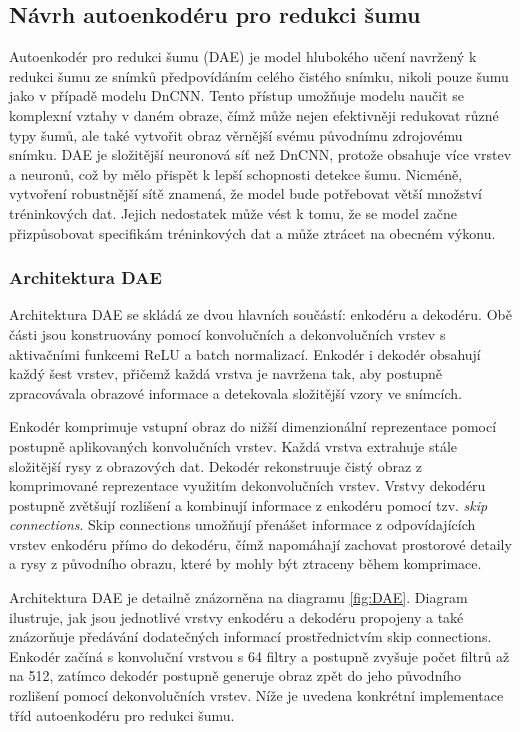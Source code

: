 \documentclass[male,czech,api_ing]{thesis}
\begin{document}
\subsection{Návrh autoenkodéru pro redukci šumu}
Autoenkodér pro redukci šumu (DAE) je model hlubokého učení navržený k redukci šumu ze snímků předpovídáním celého čistého snímku, nikoli pouze šumu jako v případě modelu DnCNN. Tento přístup umožňuje modelu naučit se komplexní vztahy v daném obraze, čímž může nejen efektivněji redukovat různé typy šumů, ale také vytvořit obraz věrnější svému původnímu zdrojovému snímku. DAE je složitější neuronová síť než DnCNN, protože obsahuje více vrstev a neuronů, což by mělo přispět k lepší schopnosti detekce šumu. Nicméně, vytvoření robustnější sítě znamená, že model bude potřebovat větší množství tréninkových dat. Jejich nedostatek může vést k tomu, že se model začne přizpůsobovat specifikám tréninkových dat a může ztrácet na obecném výkonu.

\subsubsection{Architektura DAE}
Architektura DAE se skládá ze dvou hlavních součástí: enkodéru a dekodéru. Obě části jsou konstruovány pomocí konvolučních a dekonvolučních vrstev s aktivačními funkcemi ReLU a batch normalizací. Enkodér i dekodér obsahují každý šest vrstev, přičemž každá vrstva je navržena tak, aby postupně zpracovávala obrazové informace a detekovala složitější vzory ve snímcích.

Enkodér komprimuje vstupní obraz do nižší dimenzionální reprezentace pomocí postupně aplikovaných konvolučních vrstev. Každá vrstva extrahuje stále složitější rysy z obrazových dat. Dekodér rekonstruuje čistý obraz z komprimované reprezentace využitím dekonvolučních vrstev. Vrstvy dekodéru postupně zvětšují rozlišení a kombinují informace z enkodéru pomocí tzv. \textit{skip connections}. Skip connections umožňují přenášet informace z odpovídajících vrstev enkodéru přímo do dekodéru, čímž napomáhají zachovat prostorové detaily a rysy z původního obrazu, které by mohly být ztraceny během komprimace.

Architektura DAE je detailně znázorněna na diagramu \ref{fig:DAE}. Diagram ilustruje, jak jsou jednotlivé vrstvy enkodéru a dekodéru propojeny a také znázorňuje předávání dodatečných informací prostřednictvím skip connections. Enkodér začíná s konvoluční vrstvou s 64 filtry a postupně zvyšuje počet filtrů až na 512, zatímco dekodér postupně generuje obraz zpět do jeho původního rozlišení pomocí dekonvolučních vrstev. Níže je uvedena konkrétní implementace tříd autoenkodéru pro redukci šumu.
\end{document}
